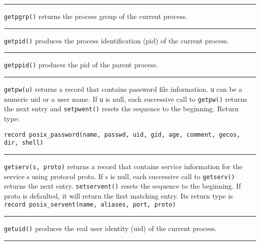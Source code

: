 \bigskip\hrule\vspace{0.1cm}

\noindent
\texttt{getpgrp()} returns the process group of the current process.

\bigskip\hrule\vspace{0.1cm}

\noindent
\texttt{getpid()} produces the process identification (pid) of the current
process.

\bigskip\hrule\vspace{0.1cm}

\noindent
\texttt{getppid()} produces the pid of the parent process.

\bigskip\hrule\vspace{0.1cm}

\noindent
\texttt{getpw(u)} returns a record that contains password file
information. \texttt{u} can
be a numeric uid or a user name. If \texttt{u} is null, each successive call to
\texttt{getpw()} returns the next entry and \texttt{setpwent()} resets
the sequence to the beginning. Return type:

\noindent
\texttt{record posix\_password(name, passwd, uid, gid, age, comment, gecos,
dir, shell)}

\bigskip\hrule\vspace{0.1cm}

\noindent
\texttt{getserv(s, proto)} returns a record that contains service information
for the service s using protocol proto. If s is null, each successive call
to \texttt{getserv()} returns the next entry. \texttt{setservent()}
resets the sequence to the beginning.
If proto is defaulted, it will return the first matching entry. Its
return type is \texttt{record posix\_servent(name, aliases, port, proto)}


\bigskip\hrule\vspace{0.1cm}

\noindent
\texttt{getuid()} produces the real user identity (uid) of the current process.

\bigskip\hrule\vspace{0.1cm}

